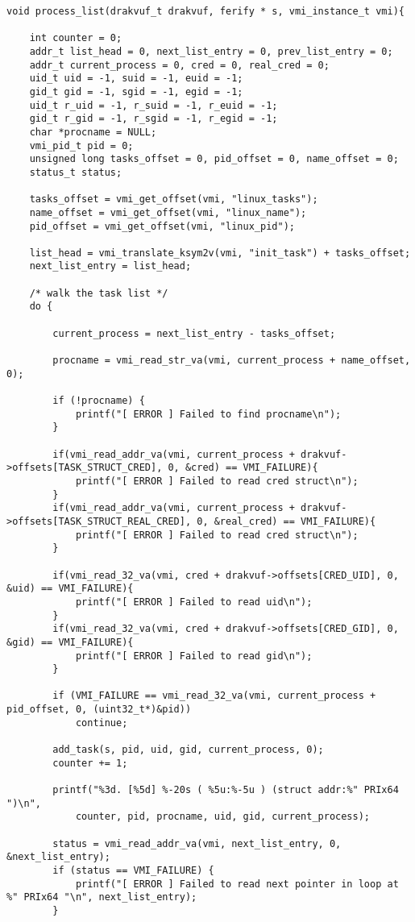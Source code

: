 {\begin{lstlisting}[style=CStyle]
void process_list(drakvuf_t drakvuf, ferify * s, vmi_instance_t vmi){

	int counter = 0;
	addr_t list_head = 0, next_list_entry = 0, prev_list_entry = 0;
	addr_t current_process = 0, cred = 0, real_cred = 0;
	uid_t uid = -1, suid = -1, euid = -1;
	gid_t gid = -1, sgid = -1, egid = -1;
	uid_t r_uid = -1, r_suid = -1, r_euid = -1;
	gid_t r_gid = -1, r_sgid = -1, r_egid = -1;
	char *procname = NULL;
	vmi_pid_t pid = 0;
	unsigned long tasks_offset = 0, pid_offset = 0, name_offset = 0;
	status_t status;
	
	tasks_offset = vmi_get_offset(vmi, "linux_tasks");
	name_offset = vmi_get_offset(vmi, "linux_name");
	pid_offset = vmi_get_offset(vmi, "linux_pid");
	
	list_head = vmi_translate_ksym2v(vmi, "init_task") + tasks_offset;
	next_list_entry = list_head;
	
	/* walk the task list */
	do {
	
		current_process = next_list_entry - tasks_offset;
		
		procname = vmi_read_str_va(vmi, current_process + name_offset, 0);
		
		if (!procname) {
			printf("[ ERROR ] Failed to find procname\n");
		}
		
		if(vmi_read_addr_va(vmi, current_process + drakvuf->offsets[TASK_STRUCT_CRED], 0, &cred) == VMI_FAILURE){
			printf("[ ERROR ] Failed to read cred struct\n");
		}
		if(vmi_read_addr_va(vmi, current_process + drakvuf->offsets[TASK_STRUCT_REAL_CRED], 0, &real_cred) == VMI_FAILURE){
			printf("[ ERROR ] Failed to read cred struct\n");
		}
		
		if(vmi_read_32_va(vmi, cred + drakvuf->offsets[CRED_UID], 0, &uid) == VMI_FAILURE){
			printf("[ ERROR ] Failed to read uid\n");
		}
		if(vmi_read_32_va(vmi, cred + drakvuf->offsets[CRED_GID], 0, &gid) == VMI_FAILURE){
			printf("[ ERROR ] Failed to read gid\n");
		}
	
		if (VMI_FAILURE == vmi_read_32_va(vmi, current_process + pid_offset, 0, (uint32_t*)&pid))
			continue;
		
		add_task(s, pid, uid, gid, current_process, 0);
		counter += 1;
		
		printf("%3d. [%5d] %-20s ( %5u:%-5u ) (struct addr:%" PRIx64 ")\n", 
			counter, pid, procname, uid, gid, current_process);
		
		status = vmi_read_addr_va(vmi, next_list_entry, 0, &next_list_entry);
		if (status == VMI_FAILURE) {
			printf("[ ERROR ] Failed to read next pointer in loop at %" PRIx64 "\n", next_list_entry);
		}
	

\end{lstlisting}}

